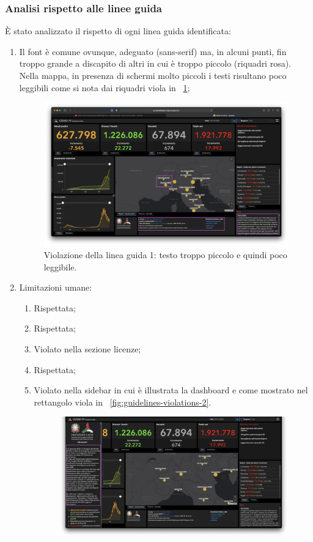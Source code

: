 \subsubsection{Analisi rispetto alle linee guida}
\`E stato analizzato il rispetto di ogni linea guida identificata:
\begin{enumerate}
    \item Il font è comune ovunque, adeguato (sans-serif) ma, in alcuni punti, fin troppo grande a discapito di altri in cui è troppo piccolo (riquadri rosa). Nella mappa, in presenza di schermi molto piccoli i testi risultano poco leggibili come si nota dai riquadri viola in ~\ref{fig:guidelines-violations-1};
        \begin{figure}[H]
        \centering
        \includegraphics[width=0.5\columnwidth]{../../../assets/images/verifica-risorse-esistenti/guidelines_violations_1}
        \caption{Violazione della linea guida 1: testo troppo piccolo e quindi poco leggibile.}
        \label{fig:guidelines-violations-1}
    \end{figure}
    \item Limitazioni umane:
        \begin{enumerate}[label=\alph*.]
                \item Rispettata;
                \item Rispettata;
                \item [\ref{lg:2.c}] Violato nella sezione licenze;
                \item [d.] Rispettata;
                \item [\ref{lg:2.e}] Violato nella sidebar in cui è illustrata la dashboard e come mostrato nel rettangolo viola in ~\ref{fig:guidelines-violations-2}.
                \begin{figure}[H]
                    \centering
                    \includegraphics[width=0.5\columnwidth]{../../../assets/images/verifica-risorse-esistenti/guidelines_violations_2}

\end{figure}
\end{enumerate}
\end{enumerate}
